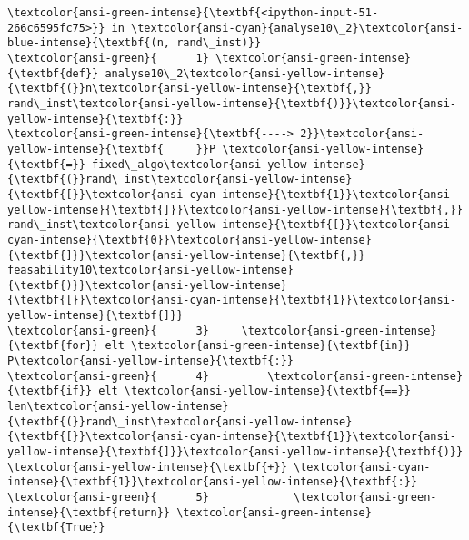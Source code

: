 \documentclass[11pt]{article}
\begin{document}
\begin{Verbatim}[commandchars=\\\{\}, frame=single, framerule=2mm, rulecolor=\color{outerrorbackground}]
\textcolor{ansi-green-intense}{\textbf{<ipython-input-51-266c6595fc75>}} in \textcolor{ansi-cyan}{analyse10\_2}\textcolor{ansi-blue-intense}{\textbf{(n, rand\_inst)}}
\textcolor{ansi-green}{      1} \textcolor{ansi-green-intense}{\textbf{def}} analyse10\_2\textcolor{ansi-yellow-intense}{\textbf{(}}n\textcolor{ansi-yellow-intense}{\textbf{,}} rand\_inst\textcolor{ansi-yellow-intense}{\textbf{)}}\textcolor{ansi-yellow-intense}{\textbf{:}}
\textcolor{ansi-green-intense}{\textbf{----> 2}}\textcolor{ansi-yellow-intense}{\textbf{     }}P \textcolor{ansi-yellow-intense}{\textbf{=}} fixed\_algo\textcolor{ansi-yellow-intense}{\textbf{(}}rand\_inst\textcolor{ansi-yellow-intense}{\textbf{[}}\textcolor{ansi-cyan-intense}{\textbf{1}}\textcolor{ansi-yellow-intense}{\textbf{]}}\textcolor{ansi-yellow-intense}{\textbf{,}} rand\_inst\textcolor{ansi-yellow-intense}{\textbf{[}}\textcolor{ansi-cyan-intense}{\textbf{0}}\textcolor{ansi-yellow-intense}{\textbf{]}}\textcolor{ansi-yellow-intense}{\textbf{,}} feasability10\textcolor{ansi-yellow-intense}{\textbf{)}}\textcolor{ansi-yellow-intense}{\textbf{[}}\textcolor{ansi-cyan-intense}{\textbf{1}}\textcolor{ansi-yellow-intense}{\textbf{]}}
\textcolor{ansi-green}{      3}     \textcolor{ansi-green-intense}{\textbf{for}} elt \textcolor{ansi-green-intense}{\textbf{in}} P\textcolor{ansi-yellow-intense}{\textbf{:}}
\textcolor{ansi-green}{      4}         \textcolor{ansi-green-intense}{\textbf{if}} elt \textcolor{ansi-yellow-intense}{\textbf{==}} len\textcolor{ansi-yellow-intense}{\textbf{(}}rand\_inst\textcolor{ansi-yellow-intense}{\textbf{[}}\textcolor{ansi-cyan-intense}{\textbf{1}}\textcolor{ansi-yellow-intense}{\textbf{]}}\textcolor{ansi-yellow-intense}{\textbf{)}} \textcolor{ansi-yellow-intense}{\textbf{+}} \textcolor{ansi-cyan-intense}{\textbf{1}}\textcolor{ansi-yellow-intense}{\textbf{:}}
\textcolor{ansi-green}{      5}             \textcolor{ansi-green-intense}{\textbf{return}} \textcolor{ansi-green-intense}{\textbf{True}}


\end{Verbatim}
\end{document}
